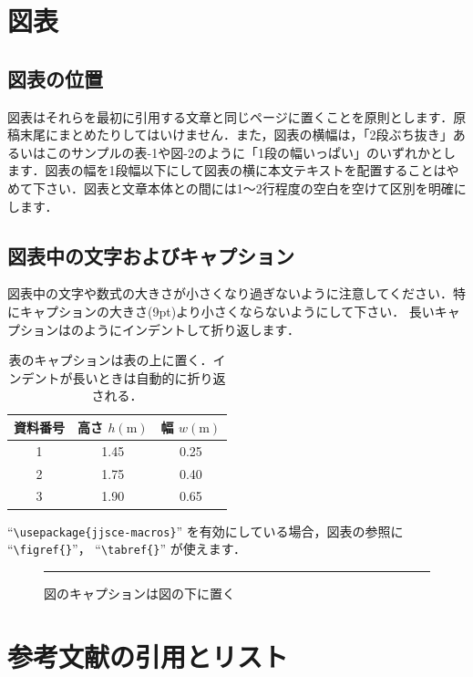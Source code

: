 \documentclass{jjsce}
\begin{document}
\section{図表}
\subsection{図表の位置}

図表はそれらを最初に引用する文章と同じページに置くことを原則とします．原稿末尾にまとめたりしてはいけません．また，図表の横幅は，「2段ぶち抜き」あるいはこのサンプルの表-1や図-2のように「1段の幅いっぱい」のいずれかとします．図表の幅を1段幅以下にして図表の横に本文テキストを配置することはやめて下さい．図表と文章本体との間には1～2行程度の空白を空けて区別を明確にします．

\subsection{図表中の文字およびキャプション}

図表中の文字や数式の大きさが小さくなり過ぎないように注意してください．特にキャプションの大きさ(9pt)より小さくならないようにして下さい．
長いキャプションはのようにインデントして折り返します．

\begin{table}[htb]
\caption{表のキャプションは表の上に置く．インデントが長いときは自動的に折り返される．}
\label{tab:sample}
\centering
\begin{tabular}{|c|c|c|}\hline
資料番号 & 高さ $h(\mathrm{m})$ &幅 $w(\mathrm{m})$ \\\hline
1 & 1.45 & 0.25\\
2 & 1.75 & 0.40\\
3 & 1.90 & 0.65\\\hline
\end{tabular}
\end{table}

``\verb|\usepackage{jjsce-macros}|''
を有効にしている場合，図表の参照に
``\verb|\figref{}|''，
``\verb|\tabref{}|''
が使えます．

\begin{figure}[htb]
\centering
\rule{20mm}{20mm}
\caption{図のキャプションは図の下に置く}
\label{fig:sample}
\end{figure}

\section{参考文献の引用とリスト}
\end{document}
